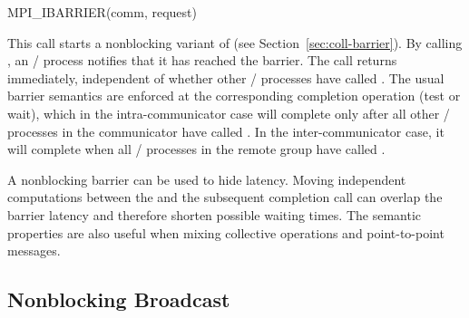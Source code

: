 \begin{funcdef}{MPI\_IBARRIER}{(\mbox{comm}, \mbox{request})}
\end{funcdef}

This call starts a nonblocking variant of
 (see Section~\ref{sec:coll-barrier}).
By calling , an \MPI/ process
notifies that it has reached the barrier. The call returns immediately,
independent of whether other \MPI/ processes have called .
The usual barrier semantics are enforced at the corresponding completion
operation (test or wait), which in the intra-communicator case will
complete only after all other \MPI/ processes in the communicator have called
. In the inter-communicator case, it will complete
when all \MPI/ processes in the remote group have called
.

\begin{users}
A nonblocking barrier can be used to hide latency. Moving
independent computations between the  and the
subsequent completion call can overlap the barrier latency and therefore
shorten possible waiting times. The semantic properties are also useful
when mixing collective operations and point-to-point messages.
\end{users}


\subsection{Nonblocking Broadcast}
\label{sec:nbcoll-ibroadcast}

